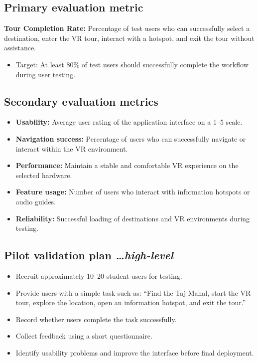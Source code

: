 \documentclass[11pt,a4paper]{article}
\newcommand{\BvrHint}[1]{%
  {\normalfont\normalsize\itshape\hfill #1}}
\begin{document}
\subsection{Primary evaluation metric}

\textbf{Tour Completion Rate:} Percentage of test users who can successfully select a destination,
enter the VR tour, interact with a hotspot, and exit the tour without assistance.

\begin{itemize}[leftmargin=0.7cm]
    \item Target: At least 80\% of test users should successfully complete the workflow during user testing.
\end{itemize}

\subsection{Secondary evaluation metrics}

\begin{itemize}[leftmargin=0.7cm]
    \item \textbf{Usability:} Average user rating of the application interface on a 1--5 scale.
    \item \textbf{Navigation success:} Percentage of users who can successfully navigate or interact within the VR environment.
    \item \textbf{Performance:} Maintain a stable and comfortable VR experience on the selected hardware.
    \item \textbf{Feature usage:} Number of users who interact with information hotspots or audio guides.
    \item \textbf{Reliability:} Successful loading of destinations and VR environments during testing.
\end{itemize}

\subsection{Pilot validation plan%
  \BvrHint{\ldots high-level}}

\begin{itemize}[leftmargin=0.7cm]
    \item Recruit approximately 10--20 student users for testing.
    \item Provide users with a simple task such as: ``Find the Taj Mahal, start the VR tour, explore the location, open an information hotspot, and exit the tour.''
    \item Record whether users complete the task successfully.
    \item Collect feedback using a short questionnaire.
    \item Identify usability problems and improve the interface before final deployment.
\end{itemize}
\end{document}
